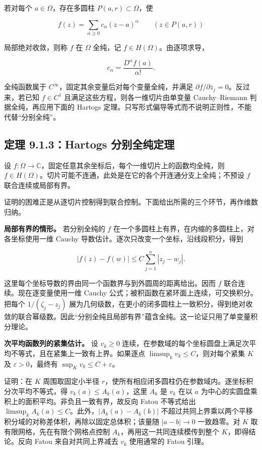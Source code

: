 \documentclass[11pt,a4paper]{article}
\begin{document}
若对每个 \(a\in\Omega\)，存在多圆柱 \(P(a,r)\subset\Omega\)，使

\[
f(z)=\sum_{\alpha\ge0}c_\alpha(z-a)^\alpha
\qquad (z\in P(a,r))
\]

局部绝对收敛，则称 \(f\) 在 \(\Omega\) 全纯，记
\(f\in H(\Omega)\)。由逐项求导，

\[
c_\alpha=\frac{D^\alpha f(a)}{\alpha!}.
\]

全纯函数属于 \(C^\infty\)，固定其余变量后对每个变量全纯，并满足
\(\partial f/\partial\overline z_j=0\)。反过来，若已知 \(f\in C^1\)
且满足这些方程，则各一维切片由单变量 Cauchy--Riemann
判据全纯，再应用下面的 Hartogs
定理。只写形式偏导等式而不说明正则性，不能代替``分别全纯''。

\subsection{定理 9.1.3：Hartogs 分别全纯定理}\label{ch09-s1-heading-5}

设
\(f:\Omega\to\mathbb C\)，固定任意其余坐标后，每个一维切片上的函数均全纯，则
\(f\in H(\Omega)\)。切片可能不连通，此处是在它的各个开连通分支上全纯；不预设
\(f\) 联合连续或局部有界。

证明的困难正是从逐切片控制得到联合控制。下面给出所需的三个环节，再作维数归纳。

\textbf{局部有界的情形。} 若分别全纯的 \(f\)
在一个多圆柱上有界，在内缩的多圆柱上，对各坐标使用一维 Cauchy
导数估计。逐次只改变一个坐标，沿线段积分，得到

\[
|f(z)-f(w)|\le C\sum_{j=1}^n|z_j-w_j|.
\]

这里每个坐标导数的界由同一个函数界与到外圆周的距离给出。因而 \(f\)
联合连续。现在逐变量使用一维 Cauchy
公式；被积函数在紧环面上连续，可交换积分。把每个 \(1/(\zeta_j-z_j)\)
展为几何级数，在更小的闭多圆柱上一致积分，得到绝对收敛的联合幂级数。因此``分别全纯且局部有界''蕴含全纯。这一论证只用了单变量积分理论。

\textbf{次平均函数列的紧集估计。} 设 \(v_k\ge0\)
连续，在参数域的每个坐标圆盘上满足次平均不等式，且在紧集上一致有上界。如果逐点
\(\limsup_k v_k\le C\)，则对每个紧集 \(K\) 及 \(\varepsilon>0\)，最终有
\(\sup_Kv_k\le C+\varepsilon\)。

证明：在 \(K\) 周围取固定小半径
\(r\)，使所有相应闭多圆柱仍在参数域内。逐坐标积分次平均不等式，得
\(v_k(a)\le A_k(a)\)，这里 \(A_k\) 是 \(v_k\) 在以 \(a\)
为中心的实圆盘乘积上的面积平均。非负且一致有界，故反向 Fatou 不等式给出
\(\limsup_k A_k(a)\le C\)。此外，\(|A_k(a)-A_k(b)|\)
不超过共同上界乘以两个平移积分域的对称差体积，再除以固定总体积；该量随
\(|a-b|\to0\) 一致趋零。对 \(K\) 取有限网格，先在有限个网格点控制
\(A_k\)，再用这一共同连续模传到整个 \(K\)，即得结论。反向 Fatou
来自对共同上界减去 \(v_k\) 使用通常的 Fatou 引理。
\end{document}
